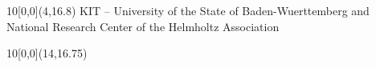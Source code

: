 \begin{titlepage}
\vspace{0.5cm}
\begin{flushleft}

\large{ \timestart \hspace*{0.25cm}}
\end{flushleft}

\vspace{1cm}
\begin{flushleft}

\large{ \hspace*{0.25cm}}
\end{flushleft}


\begin{textblock}{10}[0,0](4,16.8)
\tiny{ 
		{KIT -- University of the State of Baden-Wuerttemberg and National Research Center of the Helmholtz Association}
		{}
}
\end{textblock}

\begin{textblock}{10}[0,0](14,16.75)
\large{
	\textbf{} 
}
\end{textblock}

\end{titlepage}
